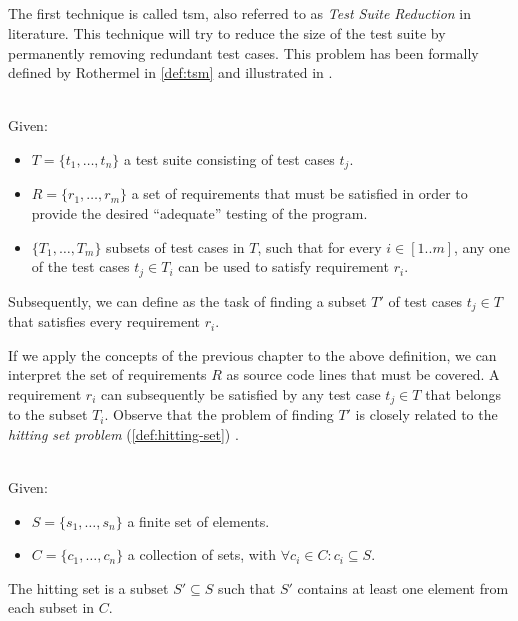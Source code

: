 
\subsection{\tsm{}}
\label{ssec:tsm}
The first technique is called \acrfull{tsm}, also referred to as \emph{Test Suite Reduction} in literature. This technique will try to reduce the size of the test suite by permanently removing redundant test cases. This problem has been formally defined by Rothermel \cite{10.1002/stv.430} in \cref{def:tsm} and illustrated in .

\begin{definition}[\tsm{}]
\label{def:tsm}
\mbox{}\\Given:
\begin{itemize}
	\item $T = \{t_1, \dots, t_n\}$ a test suite consisting of test cases $t_j$.
	\item $R = \{r_1, \dots, r_m\}$ a set of requirements that must be satisfied in order to provide the desired ``adequate'' testing of the program.
	\item $\{T_1, \dots, T_m\}$ subsets of test cases in $T$, such that for every $i \in [1..m]$, any one of the test cases $t_j \in T_i$ can be used to satisfy requirement $r_i$.
\end{itemize}

\noindent Subsequently, we can define \tsm{} as the task of finding a subset $T'$ of test cases $t_j \in T$ that satisfies every requirement $r_i$.
\end{definition}

\noindent If we apply the concepts of the previous chapter to the above definition, we can interpret the set of requirements $R$ as source code lines that must be covered. A requirement $r_i$ can subsequently be satisfied by any test case $t_j \in T$ that belongs to the subset $T_i$. Observe that the problem of finding $T'$ is closely related to the \emph{hitting set problem} (\cref{def:hitting-set}) \cite{10.1002/stv.430}.

\begin{definition}
\label{def:hitting-set}
\mbox{}\\Given:
\begin{itemize}
	\item $S = \{s_1, \dots, s_n\}$ a finite set of elements.
	\item $C = \{c_1, \dots, c_n\}$ a collection of sets, with $\forall c_i \in C : c_i \subseteq S$.
\end{itemize}

\noindent The hitting set is a subset $S' \subseteq S$ such that $S'$ contains at least one element from each subset in $C$.
\end{definition}

